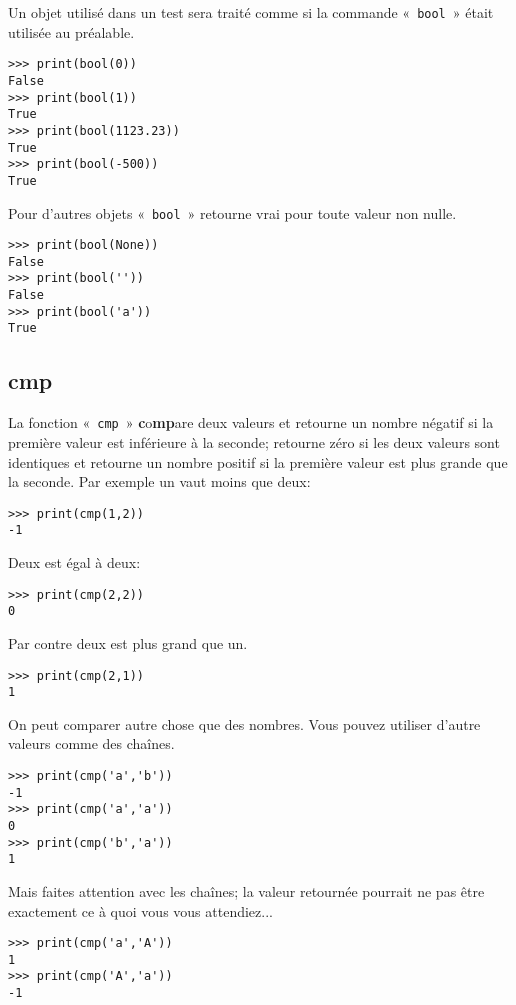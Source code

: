 Un objet utilisé dans un test sera traité comme si la commande « \texttt{bool} » était utilisée au préalable. 
\begin{Verbatim}[frame=single,rulecolor=\color{gray}]
>>> print(bool(0))
False
>>> print(bool(1))
True
>>> print(bool(1123.23))
True
>>> print(bool(-500))
True
\end{Verbatim}

Pour d'autres objets « \texttt{bool} » retourne vrai pour toute valeur non nulle.
\begin{Verbatim}[frame=single,rulecolor=\color{gray}]
>>> print(bool(None))
False
>>> print(bool(''))
False
>>> print(bool('a'))
True 
\end{Verbatim}

\subsection*{cmp}
La fonction « \texttt{cmp} »  \textbf{c}o\textbf{mp}are deux valeurs et retourne un nombre négatif si la première valeur est inférieure à la seconde; retourne zéro si les deux valeurs sont identiques et retourne un nombre positif si la première valeur est plus grande que la seconde. Par exemple un vaut moins que deux:
\begin{Verbatim}[frame=single,rulecolor=\color{gray}]
>>> print(cmp(1,2))
-1
\end{Verbatim}

Deux est égal à deux:
\begin{Verbatim}[frame=single,rulecolor=\color{gray}]
>>> print(cmp(2,2))
0
\end{Verbatim}

Par contre deux est plus grand que un.
\begin{Verbatim}[frame=single,rulecolor=\color{gray}]
>>> print(cmp(2,1))
1
\end{Verbatim}

On peut comparer autre chose que des nombres. Vous pouvez utiliser d'autre valeurs comme des chaînes.
\begin{Verbatim}[frame=single,rulecolor=\color{gray}]
>>> print(cmp('a','b'))
-1
>>> print(cmp('a','a'))
0
>>> print(cmp('b','a'))
1
\end{Verbatim}

Mais faites attention avec les chaînes; la valeur retournée pourrait ne pas être exactement ce à quoi vous vous attendiez...
\begin{Verbatim}[frame=single,rulecolor=\color{gray}]
>>> print(cmp('a','A'))
1
>>> print(cmp('A','a'))
-1
\end{Verbatim}

